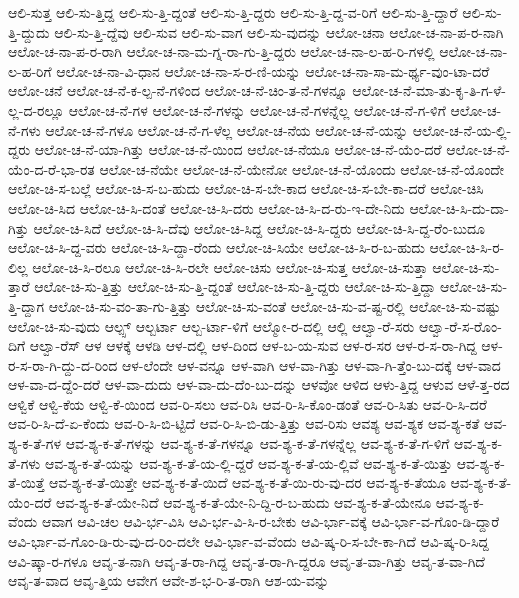 {ಆಲಿ-ಸುತ್ತ
ಆಲಿ-ಸು-ತ್ತಿದ್ದ
ಆಲಿ-ಸು-ತ್ತಿ-ದ್ದಂತೆ
ಆಲಿ-ಸು-ತ್ತಿ-ದ್ದರು
ಆಲಿ-ಸು-ತ್ತಿ-ದ್ದ-ವ-ರಿಗೆ
ಆಲಿ-ಸು-ತ್ತಿ-ದ್ದಾರೆ
ಆಲಿ-ಸು-ತ್ತಿ-ದ್ದುದು
ಆಲಿ-ಸು-ತ್ತಿ-ದ್ದೆವು
ಆಲಿ-ಸುವ
ಆಲಿ-ಸು-ವಾಗ
ಆಲಿ-ಸು-ವುದನ್ನು
ಆಲೋ-ಚನಾ
ಆಲೋ-ಚ-ನಾ-ಪ-ರ-ನಾಗಿ
ಆಲೋ-ಚ-ನಾ-ಪ-ರ-ರಾಗಿ
ಆಲೋ-ಚ-ನಾ-ಮ-ಗ್ನ-ರಾ-ಗು-ತ್ತಿ-ದ್ದರು
ಆಲೋ-ಚ-ನಾ-ಲ-ಹ-ರಿ-ಗಳಲ್ಲಿ
ಆಲೋ-ಚ-ನಾ-ಲ-ಹ-ರಿಗೆ
ಆಲೋ-ಚ-ನಾ-ವಿ-ಧಾನ
ಆಲೋ-ಚ-ನಾ-ಸ-ರ-ಣಿ-ಯನ್ನು
ಆಲೋ-ಚ-ನಾ-ಸಾ-ಮ-ರ್ಥ್ಯ-ವುಂ-ಟಾ-ದರೆ
ಆಲೋ-ಚನೆ
ಆಲೋ-ಚ-ನೆ-ಕ-ಲ್ಪ-ನೆ-ಗಳಿಂದ
ಆಲೋ-ಚ-ನೆ-ಚಿಂ-ತ-ನೆ-ಗಳನ್ನೂ
ಆಲೋ-ಚ-ನೆ-ಮಾ-ತು-ಕೃ-ತಿ-ಗ-ಳೆ-ಲ್ಲ-ದ-ರಲ್ಲೂ
ಆಲೋ-ಚ-ನೆ-ಗಳ
ಆಲೋ-ಚ-ನೆ-ಗಳನ್ನು
ಆಲೋ-ಚ-ನೆ-ಗಳನ್ನೆಲ್ಲ
ಆಲೋ-ಚ-ನೆ-ಗ-ಳಿಗೆ
ಆಲೋ-ಚ-ನೆ-ಗಳು
ಆಲೋ-ಚ-ನೆ-ಗಳೂ
ಆಲೋ-ಚ-ನೆ-ಗ-ಳೆಲ್ಲ
ಆಲೋ-ಚ-ನೆಯ
ಆಲೋ-ಚ-ನೆ-ಯನ್ನು
ಆಲೋ-ಚ-ನೆ-ಯ-ಲ್ಲಿ-ದ್ದರು
ಆಲೋ-ಚ-ನೆ-ಯಾ-ಗಿತ್ತು
ಆಲೋ-ಚ-ನೆ-ಯಿಂದ
ಆಲೋ-ಚ-ನೆಯೂ
ಆಲೋ-ಚ-ನೆ-ಯೆಂ-ದರೆ
ಆಲೋ-ಚ-ನೆ-ಯೆಂ-ದ-ರೆ-ಭಾ-ರತ
ಆಲೋ-ಚ-ನೆಯೇ
ಆಲೋ-ಚ-ನೆ-ಯೇನೋ
ಆಲೋ-ಚ-ನೆ-ಯೊಂದು
ಆಲೋ-ಚ-ನೆ-ಯೊಂದೇ
ಆಲೋ-ಚಿ-ಸ-ಬಲ್ಲೆ
ಆಲೋ-ಚಿ-ಸ-ಬ-ಹುದು
ಆಲೋ-ಚಿ-ಸ-ಬೇ-ಕಾದ
ಆಲೋ-ಚಿ-ಸ-ಬೇ-ಕಾ-ದರೆ
ಆಲೋ-ಚಿಸಿ
ಆಲೋ-ಚಿ-ಸಿದ
ಆಲೋ-ಚಿ-ಸಿ-ದಂತೆ
ಆಲೋ-ಚಿ-ಸಿ-ದರು
ಆಲೋ-ಚಿ-ಸಿ-ದ-ರು-ಇ-ದೇ-ನಿದು
ಆಲೋ-ಚಿ-ಸಿ-ದು-ದಾ-ಗಿತ್ತು
ಆಲೋ-ಚಿ-ಸಿದೆ
ಆಲೋ-ಚಿ-ಸಿ-ದೆವು
ಆಲೋ-ಚಿ-ಸಿದ್ದ
ಆಲೋ-ಚಿ-ಸಿ-ದ್ದರು
ಆಲೋ-ಚಿ-ಸಿ-ದ್ದ-ರೆಂ-ಬುದೂ
ಆಲೋ-ಚಿ-ಸಿ-ದ್ದ-ವರು
ಆಲೋ-ಚಿ-ಸಿ-ದ್ದಾ-ರೆಂದು
ಆಲೋ-ಚಿ-ಸಿಯೇ
ಆಲೋ-ಚಿ-ಸಿ-ರ-ಬ-ಹುದು
ಆಲೋ-ಚಿ-ಸಿ-ರ-ಲಿಲ್ಲ
ಆಲೋ-ಚಿ-ಸಿ-ರಲೂ
ಆಲೋ-ಚಿ-ಸಿ-ರಲೇ
ಆಲೋ-ಚಿಸು
ಆಲೋ-ಚಿ-ಸುತ್ತ
ಆಲೋ-ಚಿ-ಸುತ್ತಾ
ಆಲೋ-ಚಿ-ಸು-ತ್ತಾರೆ
ಆಲೋ-ಚಿ-ಸು-ತ್ತಿತ್ತು
ಆಲೋ-ಚಿ-ಸು-ತ್ತಿ-ದ್ದಂತೆ
ಆಲೋ-ಚಿ-ಸು-ತ್ತಿ-ದ್ದರು
ಆಲೋ-ಚಿ-ಸು-ತ್ತಿದ್ದಾ
ಆಲೋ-ಚಿ-ಸು-ತ್ತಿ-ದ್ದಾಗ
ಆಲೋ-ಚಿ-ಸು-ವಂ-ತಾ-ಗು-ತ್ತಿತ್ತು
ಆಲೋ-ಚಿ-ಸು-ವಂತೆ
ಆಲೋ-ಚಿ-ಸು-ವ-ಷ್ಟ-ರಲ್ಲಿ
ಆಲೋ-ಚಿ-ಸು-ವಷ್ಟು
ಆಲೋ-ಚಿ-ಸು-ವುದು
ಆಲ್ಪ್ಸ್
ಆಲ್ಬರ್ಟಾ
ಆಲ್ಬ-ರ್ಟಾ-ಳಿಗೆ
ಆಲ್ಮೋ-ರ-ದಲ್ಲಿ
ಆಲ್ಲಿ
ಆಲ್ವಾ-ರೆ-ಸರು
ಆಲ್ವಾ-ರೆ-ಸ-ರೊಂ-ದಿಗೆ
ಆಲ್ವಾ-ರೆಸ್
ಆಳ
ಆಳಕ್ಕೆ
ಆಳಡಿ
ಆಳ-ದಲ್ಲಿ
ಆಳ-ದಿಂದ
ಆಳ-ಬ-ಯ-ಸುವ
ಆಳ-ರ-ಸರ
ಆಳ-ರ-ಸ-ರಾ-ಗಿದ್ದ
ಆಳ-ರ-ಸ-ರಾ-ಗಿ-ದ್ದು-ದ-ರಿಂದ
ಆಳ-ಲೆಂದೇ
ಆಳ-ವನ್ನೂ
ಆಳ-ವಾಗಿ
ಆಳ-ವಾ-ಗಿತ್ತು
ಆಳ-ವಾ-ಗಿ-ತ್ತೆಂ-ಬು-ದಕ್ಕೆ
ಆಳ-ವಾದ
ಆಳ-ವಾ-ದ-ದ್ದೆಂ-ದರೆ
ಆಳ-ವಾ-ದುದು
ಆಳ-ವಾ-ದು-ದೆಂ-ಬು-ದನ್ನು
ಆಳವೋ
ಆಳಿದ
ಆಳು-ತ್ತಿದ್ದ
ಆಳುವ
ಆಳೆ-ತ್ತ-ರದ
ಆಳ್ವಿಕೆ
ಆಳ್ವಿ-ಕೆಯ
ಆಳ್ವಿ-ಕೆ-ಯಿಂದ
ಆವ-ರಿ-ಸಲು
ಆವ-ರಿಸಿ
ಆವ-ರಿ-ಸಿ-ಕೊಂ-ಡಂತೆ
ಆವ-ರಿ-ಸಿತು
ಆವ-ರಿ-ಸಿ-ದರೆ
ಆವ-ರಿ-ಸಿ-ದೆ-ಏ-ಕೆಂದು
ಆವ-ರಿ-ಸಿ-ಬಿ-ಟ್ಟಿದೆ
ಆವ-ರಿ-ಸಿ-ಬಿ-ಡು-ತ್ತಿತ್ತು
ಆವ-ರಿಸು
ಆವಶ್ಯ
ಆವ-ಶ್ಯಕ
ಆವ-ಶ್ಯ-ಕತೆ
ಆವ-ಶ್ಯ-ಕ-ತೆ-ಗಳ
ಆವ-ಶ್ಯ-ಕ-ತೆ-ಗಳನ್ನು
ಆವ-ಶ್ಯ-ಕ-ತೆ-ಗಳನ್ನೂ
ಆವ-ಶ್ಯ-ಕ-ತೆ-ಗಳನ್ನೆಲ್ಲ
ಆವ-ಶ್ಯ-ಕ-ತೆ-ಗ-ಳಿಗೆ
ಆವ-ಶ್ಯ-ಕ-ತೆ-ಗಳು
ಆವ-ಶ್ಯ-ಕ-ತೆ-ಯನ್ನು
ಆವ-ಶ್ಯ-ಕ-ತೆ-ಯ-ಲ್ಲಿ-ದ್ದರೆ
ಆವ-ಶ್ಯ-ಕ-ತೆ-ಯ-ಲ್ಲಿವೆ
ಆವ-ಶ್ಯ-ಕ-ತೆ-ಯಿತ್ತು
ಆವ-ಶ್ಯ-ಕ-ತೆ-ಯಿತ್ತೆ
ಆವ-ಶ್ಯ-ಕ-ತೆ-ಯಿತ್ತೇ
ಆವ-ಶ್ಯ-ಕ-ತೆ-ಯಿದೆ
ಆವ-ಶ್ಯ-ಕ-ತೆ-ಯಿ-ರು-ವು-ದರ
ಆವ-ಶ್ಯ-ಕ-ತೆಯೂ
ಆವ-ಶ್ಯ-ಕ-ತೆ-ಯೆಂ-ದರೆ
ಆವ-ಶ್ಯ-ಕ-ತೆ-ಯೇ-ನಿದೆ
ಆವ-ಶ್ಯ-ಕ-ತೆ-ಯೇ-ನಿ-ದ್ದಿ-ರ-ಬ-ಹುದು
ಆವ-ಶ್ಯ-ಕ-ತೆ-ಯೇನೂ
ಆವ-ಶ್ಯ-ಕ-ವೆಂದು
ಆವಾಗ
ಆವಿ-ಚಲ
ಆವಿ-ರ್ಭ-ವಿಸಿ
ಆವಿ-ರ್ಭ-ವಿ-ಸಿ-ರ-ಬೇಕು
ಆವಿ-ರ್ಭಾ-ವಕ್ಕೆ
ಆವಿ-ರ್ಭಾ-ವ-ಗೊಂ-ಡಿ-ದ್ದಾರೆ
ಆವಿ-ರ್ಭಾ-ವ-ಗೊಂ-ಡಿ-ರು-ವು-ದ-ರಿಂ-ದಲೇ
ಆವಿ-ರ್ಭಾ-ವ-ವೆಂದು
ಆವಿ-ಷ್ಕ-ರಿ-ಸ-ಬೇ-ಕಾ-ಗಿದೆ
ಆವಿ-ಷ್ಕ-ರಿ-ಸಿದ್ದ
ಆವಿ-ಷ್ಕಾ-ರ-ಗಳೂ
ಆವೃ-ತ-ನಾಗಿ
ಆವೃ-ತ-ರಾ-ಗಿದ್ದ
ಆವೃ-ತ-ರಾ-ಗಿ-ದ್ದರೂ
ಆವೃ-ತ-ವಾ-ಗಿತ್ತು
ಆವೃ-ತ-ವಾ-ಗಿದೆ
ಆವೃ-ತ-ವಾದ
ಆವೃ-ತ್ತಿಯ
ಆವೇಗ
ಆವೇ-ಶ-ಭ-ರಿ-ತ-ರಾಗಿ
ಆಶ-ಯ-ವನ್ನು
}
